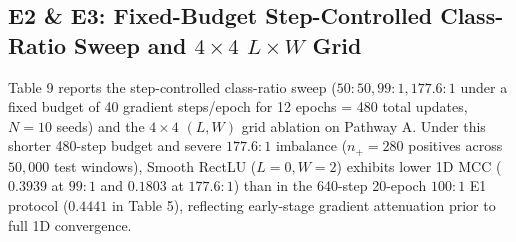\documentclass[11pt, a4paper]{article}
\begin{document}
\subsection{E2 \& E3: Fixed-Budget Step-Controlled Class-Ratio Sweep and $4 \times 4$ $L \times W$ Grid}
Table 9 reports the step-controlled class-ratio sweep ($50:50, 99:1, 177.6:1$ under a fixed budget of 40 gradient steps/epoch for 12 epochs = 480 total updates, $N=10$ seeds) and the $4 \times 4$ $(L, W)$ grid ablation on Pathway A. Under this shorter 480-step budget and severe $177.6:1$ imbalance ($n_{+}=280$ positives across $50,000$ test windows), Smooth RectLU ($L=0, W=2$) exhibits lower 1D MCC ($0.3939$ at $99:1$ and $0.1803$ at $177.6:1$) than in the 640-step 20-epoch $100:1$ E1 protocol ($0.4441$ in Table 5), reflecting early-stage gradient attenuation prior to full 1D convergence.
\end{document}
